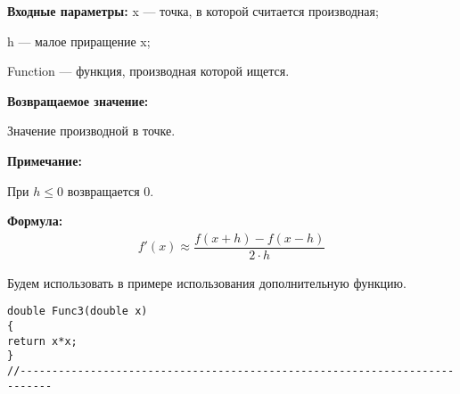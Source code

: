 \textbf{Входные параметры:}
 x --- точка, в которой считается производная;
 
 h --- малое приращение x;
 
 Function --- функция, производная которой ищется.

\textbf{Возвращаемое значение:}
 
 Значение производной в точке.
 
 \textbf{Примечание:}
 
 При $h\leq0$ возвращается $0$.

\textbf{Формула:}
\begin{eqnarray*}
f'\left( x\right) \approx \dfrac{f\left( x+h\right)-f\left( x-h\right) }{2\cdot h}
\end{eqnarray*}

Будем использовать в примере использования дополнительную функцию.

\begin{lstlisting}[caption=Дополнительная функция]
double Func3(double x)
{
return x*x;
}
//---------------------------------------------------------------------------
\end{lstlisting}
